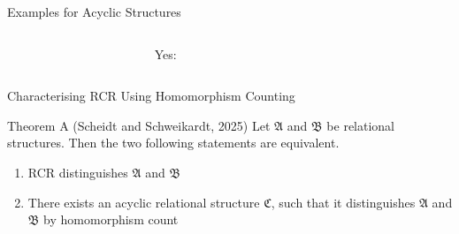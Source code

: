 \documentclass[aspectratio=169]{beamer}
\begin{document}
\begin{frame}{Examples for Acyclic Structures}
\begin{columns}
\begin{column}{0.4\textwidth}
			\end{column}
			\begin{column}{0.2\textwidth}
				\centering
				\hfill Yes:
			\end{column}
			\begin{column}{0.4\textwidth}
				\centering
			\end{column}
		\end{columns}
	\end{frame}
	
	\begin{frame}{Characterising RCR Using Homomorphism Counting}
		\begin{block}{Theorem A (Scheidt and Schweikardt, 2025)}
			Let $\mathfrak A$ and $\mathfrak B$ be relational structures.
			Then the two following statements are equivalent.
			\begin{enumerate}
				\item RCR distinguishes $\mathfrak A$ and $\mathfrak B$
				\item There exists an acyclic relational structure $\mathfrak C$, such that it distinguishes $\mathfrak A$ and $\mathfrak B$ by homomorphism count
			\end{enumerate}
		\end{block}
	\end{frame}
	
\end{document}
